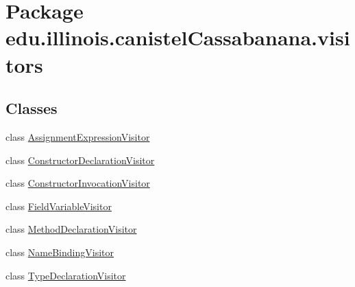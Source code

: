 \hypertarget{namespaceedu_1_1illinois_1_1canistelCassabanana_1_1visitors}{
\section{Package edu.illinois.canistelCassabanana.visitors}
\label{namespaceedu_1_1illinois_1_1canistelCassabanana_1_1visitors}
}
\subsection*{Classes}
\begin{DoxyCompactItemize}
\item 
class \hyperlink{classedu_1_1illinois_1_1canistelCassabanana_1_1visitors_1_1AssignmentExpressionVisitor}{AssignmentExpressionVisitor}
\item 
class \hyperlink{classedu_1_1illinois_1_1canistelCassabanana_1_1visitors_1_1ConstructorDeclarationVisitor}{ConstructorDeclarationVisitor}
\item 
class \hyperlink{classedu_1_1illinois_1_1canistelCassabanana_1_1visitors_1_1ConstructorInvocationVisitor}{ConstructorInvocationVisitor}
\item 
class \hyperlink{classedu_1_1illinois_1_1canistelCassabanana_1_1visitors_1_1FieldVariableVisitor}{FieldVariableVisitor}
\item 
class \hyperlink{classedu_1_1illinois_1_1canistelCassabanana_1_1visitors_1_1MethodDeclarationVisitor}{MethodDeclarationVisitor}
\item 
class \hyperlink{classedu_1_1illinois_1_1canistelCassabanana_1_1visitors_1_1NameBindingVisitor}{NameBindingVisitor}
\item 
class \hyperlink{classedu_1_1illinois_1_1canistelCassabanana_1_1visitors_1_1TypeDeclarationVisitor}{TypeDeclarationVisitor}
\end{DoxyCompactItemize}

